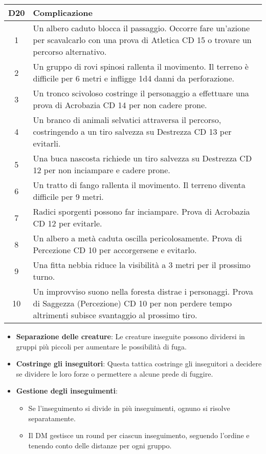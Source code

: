 \begin{longtable}{|c|p{12cm}|}
    \hline
    \textbf{D20} & \textbf{Complicazione} \\
    \hline
    1 & Un albero caduto blocca il passaggio. Occorre fare un’azione per scavalcarlo con una prova di Atletica CD 15 o trovare un percorso alternativo. \\
    2 & Un gruppo di rovi spinosi rallenta il movimento. Il terreno è difficile per 6 metri e infligge 1d4 danni da perforazione. \\
    3 & Un tronco scivoloso costringe il personaggio a effettuare una prova di Acrobazia CD 14 per non cadere prone. \\
    4 & Un branco di animali selvatici attraversa il percorso, costringendo a un tiro salvezza su Destrezza CD 13 per evitarli. \\
    5 & Una buca nascosta richiede un tiro salvezza su Destrezza CD 12 per non inciampare e cadere prone. \\
    6 & Un tratto di fango rallenta il movimento. Il terreno diventa difficile per 9 metri. \\
    7 & Radici sporgenti possono far inciampare. Prova di Acrobazia CD 12 per evitarle. \\
    8 & Un albero a metà caduta oscilla pericolosamente. Prova di Percezione CD 10 per accorgersene e evitarlo. \\
    9 & Una fitta nebbia riduce la visibilità a 3 metri per il prossimo turno. \\
    10 & Un improvviso suono nella foresta distrae i personaggi. Prova di Saggezza (Percezione) CD 10 per non perdere tempo altrimenti subisce svantaggio al prossimo tiro. \\
    \hline
\end{longtable}


\begin{itemize}
    \item \textbf{Separazione delle creature}: Le creature inseguite possono dividersi in gruppi più piccoli per aumentare le possibilità di fuga.
    \item \textbf{Costringe gli inseguitori}: Questa tattica costringe gli inseguitori a decidere se dividere le loro forze o permettere a alcune prede di fuggire.
    \item \textbf{Gestione degli inseguimenti}:
    \begin{itemize}
        \item Se l'inseguimento si divide in più inseguimenti, ognuno si risolve separatamente.
        \item Il DM gestisce un round per ciascun inseguimento, seguendo l'ordine e tenendo conto delle distanze per ogni gruppo.
    \end{itemize}
\end{itemize}



